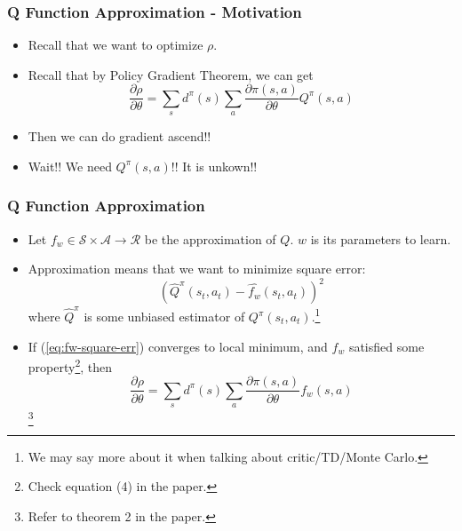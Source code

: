 \begin{frame}
  \frametitle{Q Function Approximation - Motivation}
  \begin{itemize}
  \item Recall that we want to optimize $\rho$.
  \item Recall that by Policy Gradient Theorem, we can get
    \begin{equation*}
      \frac{\partial \rho}{\partial \theta} = \sum_s d^\pi (s) \sum_a \frac{\partial \pi(s, a)}{\partial \theta} Q^\pi(s, a)
    \end{equation*}
  \item Then we can do gradient ascend!!
  \item Wait!! We need $Q^\pi(s, a)$!! It is unkown!!
  \end{itemize}
\end{frame}


\begin{frame}
  \frametitle{Q Function Approximation}
  \begin{itemize}
  \item Let $f_w \in \mathcal{S} \times \mathcal{A} \to \mathcal{R}$ be the approximation of $Q$. $w$ is its parameters to learn.
  \item Approximation means that we want to minimize square error:
    \begin{equation}
      (\hat{Q}^{\pi}(s_t, a_t) - \hat{f_w}(s_t, a_t))^2\label{eq:fw-square-err}
    \end{equation}
    where $\hat{Q}^{\pi}$ is some unbiased estimator of $Q^\pi(s_t, a_t)$.\footnote{We may say more about it when talking about critic/TD/Monte Carlo.}
  \item If (\ref{eq:fw-square-err}) converges to local minimum, and $f_w$ satisfied some property\footnote{Check equation (4) in the paper.}, then
    \begin{equation}
      \frac{\partial \rho}{\partial \theta} = \sum_s d^\pi (s) \sum_a \frac{\partial \pi(s, a)}{\partial \theta} f_w(s, a) \label{eq:pgfa}
    \end{equation}\footnote{Refer to theorem 2 in the paper.}
  \end{itemize}
\end{frame}